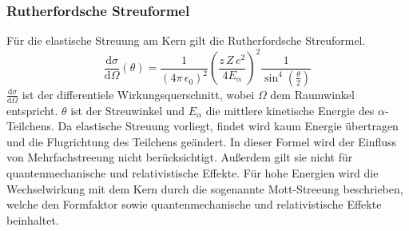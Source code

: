 \subsubsection{Rutherfordsche Streuformel}
Für die elastische Streuung am Kern gilt die Rutherfordsche Streuformel.
\begin{equation}
  \label{eqn:rutherford}
\frac{\mathrm{d}\sigma}{\mathrm{d}\Omega}(\theta)=\frac{1}{(4\pi\,\epsilon_0)^2}\left(\frac{z\,Z\,e^2}{4E_\mathrm{\alpha}}\right)^2 \frac{1}{\sin^4\left(\frac{\theta}{2}\right)}
\end{equation}
$\frac{\mathrm{d}\sigma}{\mathrm{d}\Omega}$ ist der differentiele Wirkungsquerschnitt, wobei $\Omega$ dem Raumwinkel entspricht. $\theta$ ist der Streuwinkel und $E_{\alpha}$ die mittlere kinetische Energie des $\alpha$-Teilchens. Da elastische Streuung vorliegt, findet wird kaum Energie übertragen und die Flugrichtung des Teilchens geändert.
In dieser Formel wird der Einfluss von Mehrfachstreeung nicht berücksichtigt. Außerdem gilt sie nicht für quantenmechanische und relativistische Effekte. Für hohe Energien wird die
Wechselwirkung mit dem Kern durch die sogenannte Mott-Streeung beschrieben, welche den Formfaktor sowie quantenmechanische und relativistische Effekte beinhaltet.
